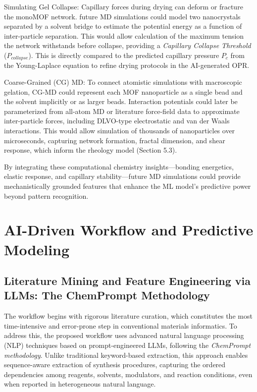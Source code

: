 \documentclass[12pt,a4paper]{article}
\begin{document}
Simulating Gel Collapse:  
Capillary forces during drying can deform or fracture the monoMOF network. future MD simulations could model two nanocrystals separated by a solvent bridge to estimate the potential energy as a function of inter-particle separation. This would allow calculation of the maximum tension the network withstands before collapse, providing a \textit{Capillary Collapse Threshold} ($P_{collapse}$). This is directly compared to the predicted capillary pressure $P_c$ from the Young-Laplace equation to refine drying protocols in the AI-generated OPR.

Coarse-Grained (CG) MD:  
To connect atomistic simulations with macroscopic gelation, CG-MD could represent each MOF nanoparticle as a single bead and the solvent implicitly or as larger beads. Interaction potentials could later be parameterized from all-atom MD or literature force-field data to approximate inter-particle forces, including DLVO-type electrostatic and van der Waals interactions. This would allow simulation of thousands of nanoparticles over microseconds, capturing network formation, fractal dimension, and shear response, which inform the rheology model (Section 5.3).\cite{ref52}

By integrating these computational chemistry insights—bonding energetics, elastic response, and capillary stability—future MD simulations could provide mechanistically grounded features that enhance the ML model's predictive power beyond pattern recognition.


\section{AI-Driven Workflow and Predictive Modeling}

\subsection{Literature Mining and Feature Engineering via LLMs: The ChemPrompt Methodology}

The workflow begins with rigorous literature curation, which constitutes the most time-intensive and error-prone step in conventional materials informatics. To address this, the proposed workflow uses advanced natural language processing (NLP) techniques based on prompt-engineered LLMs, following the \textit{ChemPrompt methodology}\cite{ref3}. Unlike traditional keyword-based extraction, this approach enables sequence-aware extraction of synthesis procedures, capturing the ordered dependencies among reagents, solvents, modulators, and reaction conditions, even when reported in heterogeneous natural language.  
\end{document}
